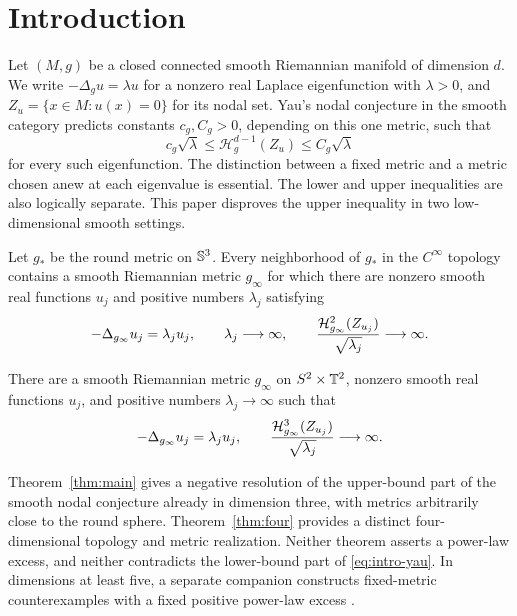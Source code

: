 \section{Introduction}
\label{sec:introduction}

Let $(M,g)$ be a closed connected smooth Riemannian manifold of dimension $d$.
We write $-\Delta_g u=\lambda u$ for a nonzero real Laplace eigenfunction
with $\lambda>0$, and $Z_u=\{x\in M:u(x)=0\}$ for its nodal set. Yau's
nodal conjecture in the smooth category predicts constants $c_g,C_g>0$,
depending on this one metric, such that
\begin{equation}\label{eq:intro-yau}
 c_g\sqrt\lambda\le\mathcal H_g^{d-1}(Z_u)
              \le C_g\sqrt\lambda
\end{equation}
for every such eigenfunction. The distinction between a fixed metric and a
metric chosen anew at each eigenvalue is essential. The lower and upper
inequalities are also logically separate. This paper disproves the upper
inequality in two low-dimensional smooth settings.

\begin{theorem}\label{thm:main}
Let $g_*$ be the round metric on $\mathbb S^3$. Every neighborhood of $g_*$ in
the $C^\infty$ topology contains a smooth Riemannian metric $g_\infty$ for
which there are nonzero smooth real functions $u_j$ and positive numbers
$\lambda_j$ satisfying
\[
 -\Delta_{g_\infty}u_j=\lambda_j u_j,\qquad
 \lambda_j\longrightarrow\infty,\qquad
 \frac{\mathcal H^2_{g_\infty}(Z_{u_j})}{\sqrt{\lambda_j}}
       \longrightarrow\infty.
\]
\end{theorem}

\begin{theorem}\label{thm:four}
There are a smooth Riemannian metric $g_\infty$ on $S^2\times\mathbb T^2$,
nonzero smooth real functions $u_j$, and positive numbers
$\lambda_j\to\infty$ such that
\[
 -\Delta_{g_\infty}u_j=\lambda_j u_j,\qquad
 \frac{\mathcal H^3_{g_\infty}(Z_{u_j})}{\sqrt{\lambda_j}}
       \longrightarrow\infty.
\]
\end{theorem}

Theorem~\ref{thm:main} gives a negative resolution of the upper-bound
part of the smooth nodal conjecture already in dimension three, with
metrics arbitrarily close to the round sphere. Theorem~\ref{thm:four}
provides a distinct four-dimensional topology and metric realization.
Neither theorem asserts a power-law excess, and neither contradicts the
lower-bound part of \eqref{eq:intro-yau}.
In dimensions at least five, a separate companion constructs fixed-metric
counterexamples with a fixed positive power-law excess
\cite[Theorem~1.1 and Corollary~5.6]{OpenAINodalPower2026}.

